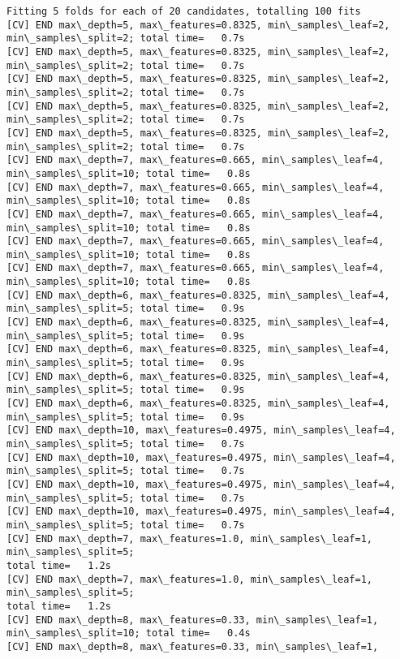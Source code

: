 \documentclass[11pt]{article}
\begin{document}
    \begin{Verbatim}[commandchars=\\\{\}]
Fitting 5 folds for each of 20 candidates, totalling 100 fits
[CV] END max\_depth=5, max\_features=0.8325, min\_samples\_leaf=2,
min\_samples\_split=2; total time=   0.7s
[CV] END max\_depth=5, max\_features=0.8325, min\_samples\_leaf=2,
min\_samples\_split=2; total time=   0.7s
[CV] END max\_depth=5, max\_features=0.8325, min\_samples\_leaf=2,
min\_samples\_split=2; total time=   0.7s
[CV] END max\_depth=5, max\_features=0.8325, min\_samples\_leaf=2,
min\_samples\_split=2; total time=   0.7s
[CV] END max\_depth=5, max\_features=0.8325, min\_samples\_leaf=2,
min\_samples\_split=2; total time=   0.7s
[CV] END max\_depth=7, max\_features=0.665, min\_samples\_leaf=4,
min\_samples\_split=10; total time=   0.8s
[CV] END max\_depth=7, max\_features=0.665, min\_samples\_leaf=4,
min\_samples\_split=10; total time=   0.8s
[CV] END max\_depth=7, max\_features=0.665, min\_samples\_leaf=4,
min\_samples\_split=10; total time=   0.8s
[CV] END max\_depth=7, max\_features=0.665, min\_samples\_leaf=4,
min\_samples\_split=10; total time=   0.8s
[CV] END max\_depth=7, max\_features=0.665, min\_samples\_leaf=4,
min\_samples\_split=10; total time=   0.8s
[CV] END max\_depth=6, max\_features=0.8325, min\_samples\_leaf=4,
min\_samples\_split=5; total time=   0.9s
[CV] END max\_depth=6, max\_features=0.8325, min\_samples\_leaf=4,
min\_samples\_split=5; total time=   0.9s
[CV] END max\_depth=6, max\_features=0.8325, min\_samples\_leaf=4,
min\_samples\_split=5; total time=   0.9s
[CV] END max\_depth=6, max\_features=0.8325, min\_samples\_leaf=4,
min\_samples\_split=5; total time=   0.9s
[CV] END max\_depth=6, max\_features=0.8325, min\_samples\_leaf=4,
min\_samples\_split=5; total time=   0.9s
[CV] END max\_depth=10, max\_features=0.4975, min\_samples\_leaf=4,
min\_samples\_split=5; total time=   0.7s
[CV] END max\_depth=10, max\_features=0.4975, min\_samples\_leaf=4,
min\_samples\_split=5; total time=   0.7s
[CV] END max\_depth=10, max\_features=0.4975, min\_samples\_leaf=4,
min\_samples\_split=5; total time=   0.7s
[CV] END max\_depth=10, max\_features=0.4975, min\_samples\_leaf=4,
min\_samples\_split=5; total time=   0.7s
[CV] END max\_depth=7, max\_features=1.0, min\_samples\_leaf=1, min\_samples\_split=5;
total time=   1.2s
[CV] END max\_depth=7, max\_features=1.0, min\_samples\_leaf=1, min\_samples\_split=5;
total time=   1.2s
[CV] END max\_depth=8, max\_features=0.33, min\_samples\_leaf=1,
min\_samples\_split=10; total time=   0.4s
[CV] END max\_depth=8, max\_features=0.33, min\_samples\_leaf=1,

\end{Verbatim}
\end{document}
